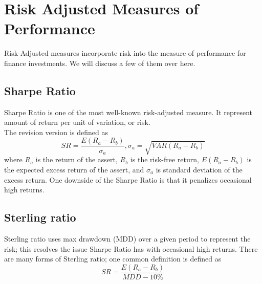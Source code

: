 \section{Risk Adjusted Measures of Performance}
Risk-Adjusted measures incorporate risk into the measure of performance for finance investments. 
We will discuss a few of them over here.
\subsection{Sharpe Ratio}
Sharpe Ratio\cite{Sharpe49} is one of the most well-known risk-adjusted measure. It represent amount of return per unit of variation, or risk.\\
The revision version is defined as
\[ SR = \frac{E(R_a - R_b)}{\sigma_a},
\sigma_a = \sqrt{VAR(R_a-R_b)}\]
where \(R_a\) is the return of the assert, 
\(R_b\) is the risk-free return,
\(E(R_a - R_b)\) is the expected excess return of the assert,
and \(\sigma_a\) is standard deviation of the excess return.
One downside of the Sharpe Ratio is that it penalizes occasional high returns.\cite{9206647}
\subsection{Sterling ratio}
Sterling ratio\cite{magdon2004maximum} uses max drawdown (MDD) over a given period to represent the risk; this resolves the issue Sharpe Ratio has with occasional high returns. 
There are many forms of Sterling ratio; one common definition\cite{magdon2004maximum} is defined as 
\[ SR = \frac{E(R_a - R_b)}{MDD - 10\%}\]
